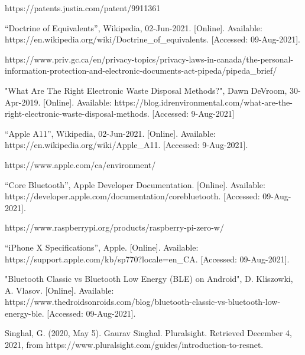 \documentclass[a4paper,11pt]{article}
\begin{document}
\begin{thebibliography}{9}
https://patents.justia.com/patent/9911361

“Doctrine of Equivalents”, Wikipedia, 02-Jun-2021. [Online]. Available: https://en.wikipedia.org/wiki/Doctrine\_of\_equivalents. [Accessed: 09-Aug-2021].

https://www.priv.gc.ca/en/privacy-topics/privacy-laws-in-canada/the-personal-information-protection-and-electronic-documents-act-pipeda/pipeda\_brief/

"What Are The Right Electronic Waste Disposal Methods?", Dawn DeVroom, 30-Apr-2019. [Online]. Available: https://blog.idrenvironmental.com/what-are-the-right-electronic-waste-disposal-methods. [Accessed: 9-Aug-2021]

“Apple A11”, Wikipedia, 02-Jun-2021. [Online]. Available:
https://en.wikipedia.org/wiki/Apple\_A11. [Accessed: 9-Aug-2021].

https://www.apple.com/ca/environment/

“Core Bluetooth”, Apple Developer Documentation. [Online]. Available: https://developer.apple.com/documentation/corebluetooth. [Accessed: 09-Aug-2021]. 

https://www.raspberrypi.org/products/raspberry-pi-zero-w/

“iPhone X Specifications”, Apple. [Online]. Available: https://support.apple.com/kb/sp770?locale=en\_CA. [Accessed: 09-Aug-2021]. 

"Bluetooth Classic vs Bluetooth Low Energy (BLE) on Android", D. Kliszowki, A. Vlasov. [Online]. Available: https://www.thedroidsonroids.com/blog/bluetooth-classic-vs-bluetooth-low-energy-ble. [Accessed: 09-Aug-2021].

Singhal, G. (2020, May 5). Gaurav Singhal. Pluralsight. Retrieved December 4, 2021, from https://www.pluralsight.com/guides/introduction-to-resnet.


\end{thebibliography}
\end{document}
